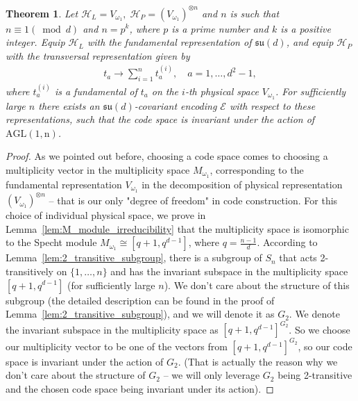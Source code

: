 \documentclass[11pt,letterpaper]{article}
\theoremstyle{plain}
\theoremstyle{plain}
\theoremstyle{plain}
\theoremstyle{plain}
\theoremstyle{plain}
\theoremstyle{plain}
\theoremstyle{plain}
\newtheorem{smtheorem}{Theorem}[section]
\theoremstyle{definition}
\theoremstyle{plain}
\begin{document}
\begin{smtheorem}\label{thrm:2_transitive_covariant_code}
        Let
    $
        \mathcal H_L=V_{\omega_1},\;
        \mathcal H_P=(V_{\omega_1})^{\otimes n}
    $
    and $n$ is such that $n \equiv 1(\bmod d)$ and $n=p^k$, where $p$ is a prime number and $k$ is a positive integer.
    Equip \(\mathcal H_L\) with the fundamental representation of
    \(\mathfrak{su}(d)\), and equip \(\mathcal H_P\) with the transversal
    representation given by
    \begin{equation}
    \begin{gathered}
    t_a \rightarrow \sum_{i=1}^n t_a^{(i)}, \quad a=1,\ldots,d^2-1,
    \end{gathered}
    \end{equation} 
    where $t_a^{(i)}$ is a fundamental of $t_a$ on the $i$-th physical space $V_{\omega_1}$.
    For sufficiently
    large $n$ there exists an $\mathfrak{su}(d)$-covariant encoding $\mathcal{E}$ with respect to these representations, 
    such that the code space is invariant under the action of $\mathrm{AGL(1, n)}$. 
\end{smtheorem}
\begin{proof}
    As we pointed out before, choosing a code space comes to choosing a multiplicity vector in the multiplicity space $M_{\omega_1}$,
    corresponding to the fundamental representation $V_{\omega_1}$ in the decomposition of physical representation $(V_{\omega_1})^{\otimes n}$ -- that is our only "degree of freedom" in code construction. 
    For this choice of individual physical space, we prove in Lemma~\ref{lem:M_module_irreducibility} that the multiplicity space is isomorphic to the Specht module $M_{\omega_1}\cong [q+1, q^{d-1}]$, 
    where $q=\frac{n-1}{d}$. According to Lemma~\ref{lem:2_transitive_subgroup}, there is a subgroup of $S_n$ that acts 2-transitively on $\{1, \dots, n\}$ and has the invariant subspace in the multiplicity space $[q+1, q^{d-1}]$ 
    (for sufficiently large $n$). We don't care about the structure of this subgroup (the detailed description can be found in the proof of Lemma~\ref{lem:2_transitive_subgroup}), 
    and we will denote it as $G_2$. We denote the invariant subspace in the multiplicity space as $[q+1, q^{d-1}]^{G_2}$. 
    So we choose our multiplicity vector to be one of the vectors from $[q+1, q^{d-1}]^{G_2}$, so our code space is invariant under the action of $G_2$. 
    (That is actually the reason why we don't care about the structure of $G_2$ -- we will only leverage $G_2$ being 2-transitive and the chosen code space being invariant under its action).
\end{proof}
\end{document}

